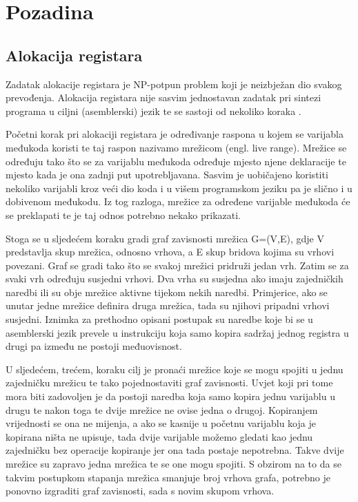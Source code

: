 \documentclass[conference]{IEEEtran}
\begin{document}
\section{Pozadina}

\subsection{Alokacija registara}

Zadatak alokacije registara je NP-potpun problem koji je neizbježan dio svakog prevođenja. Alokacija registara nije sasvim jednostavan zadatak pri sintezi programa u ciljni (asemblerski) jezik te se sastoji od nekoliko koraka \cite{b1}.

Početni korak pri alokaciji registara je određivanje raspona u kojem se varijabla međukoda koristi te taj raspon nazivamo mrežicom (engl. live range). Mrežice se određuju tako što se za varijablu međukoda određuje mjesto njene deklaracije te mjesto kada je ona zadnji put upotrebljavana. Sasvim je uobičajeno koristiti nekoliko varijabli kroz veći dio koda i u višem programskom jeziku pa je slično i u dobivenom međukodu. Iz tog razloga, mrežice za određene varijable međukoda će se preklapati te je taj odnos potrebno nekako prikazati.

Stoga se u sljedećem koraku gradi graf zavisnosti mrežica G=(V,E), gdje V predstavlja skup mrežica, odnosno vrhova, a E skup bridova kojima su vrhovi povezani. Graf se gradi tako što se svakoj mrežici pridruži jedan vrh. Zatim se za svaki vrh određuju susjedni vrhovi. Dva vrha su susjedna ako imaju zajedničkih naredbi ili su obje mrežice aktivne tijekom nekih naredbi. Primjerice, ako se unutar jedne mrežice definira druga mrežica, tada su njihovi pripadni vrhovi susjedni. Iznimka za prethodno opisani postupak su naredbe koje bi se u asemblerski jezik prevele u instrukciju koja samo kopira sadržaj jednog registra u drugi pa između ne postoji međuovisnost.

U sljedećem, trećem, koraku cilj je pronaći mrežice koje se mogu spojiti u jednu zajedničku mrežicu te tako pojednostaviti graf zavisnosti. Uvjet koji pri tome mora biti zadovoljen je da postoji naredba koja samo kopira jednu varijablu u drugu te nakon toga te dvije mrežice ne ovise jedna o drugoj. Kopiranjem vrijednosti se ona ne mijenja, a ako se kasnije u početnu varijablu koja je kopirana ništa ne upisuje, tada dvije varijable možemo gledati kao jednu zajedničku bez operacije kopiranje jer ona tada postaje nepotrebna. Takve dvije mrežice su zapravo jedna mrežica te se one mogu spojiti. S obzirom na to da se takvim postupkom stapanja mrežica smanjuje broj vrhova grafa, potrebno je ponovno izgraditi graf zavisnosti, sada s novim skupom vrhova.
\end{document}
